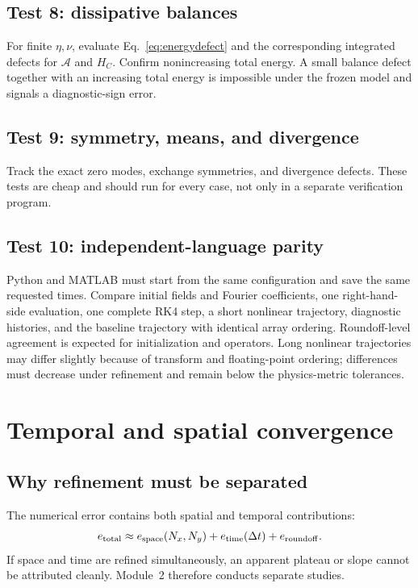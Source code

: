\documentclass[11pt]{article}
\begin{document}
\subsection{Test 8: dissipative balances}

For finite $\eta,\nu$, evaluate Eq.~\eqref{eq:energydefect} and the corresponding integrated defects for $\mathcal A$ and $H_C$. Confirm nonincreasing total energy. A small balance defect together with an increasing total energy is impossible under the frozen model and signals a diagnostic-sign error.

\subsection{Test 9: symmetry, means, and divergence}

Track the exact zero modes, exchange symmetries, and divergence defects. These tests are cheap and should run for every case, not only in a separate verification program.

\subsection{Test 10: independent-language parity}

Python and MATLAB must start from the same configuration and save the same requested times. Compare initial fields and Fourier coefficients, one right-hand-side evaluation, one complete RK4 step, a short nonlinear trajectory, diagnostic histories, and the baseline trajectory with identical array ordering. Roundoff-level agreement is expected for initialization and operators. Long nonlinear trajectories may differ slightly because of transform and floating-point ordering; differences must decrease under refinement and remain below the physics-metric tolerances.

\section{Temporal and spatial convergence}
\label{sec:convergence}

\subsection{Why refinement must be separated}

The numerical error contains both spatial and temporal contributions:
\begin{equation}
e_{\rm total}\approx e_{\rm space}(N_x,N_y)
+e_{\rm time}(\Delta t)
+e_{\rm roundoff}.
\end{equation}
If space and time are refined simultaneously, an apparent plateau or slope cannot be attributed cleanly. Module~2 therefore conducts separate studies.
\end{document}
